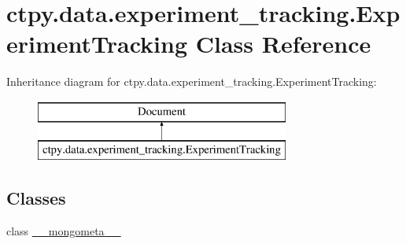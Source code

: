 \hypertarget{classctpy_1_1data_1_1experiment__tracking_1_1_experiment_tracking}{\section{ctpy.\-data.\-experiment\-\_\-tracking.\-Experiment\-Tracking Class Reference}
\label{classctpy_1_1data_1_1experiment__tracking_1_1_experiment_tracking}
}
Inheritance diagram for ctpy.\-data.\-experiment\-\_\-tracking.\-Experiment\-Tracking\-:\begin{figure}[H]
\begin{center}
\leavevmode
\includegraphics[height=2.000000cm]{classctpy_1_1data_1_1experiment__tracking_1_1_experiment_tracking}
\end{center}
\end{figure}
\subsection*{Classes}
\begin{DoxyCompactItemize}
\item 
class \hyperlink{classctpy_1_1data_1_1experiment__tracking_1_1_experiment_tracking_1_1____mongometa____}{\-\_\-\-\_\-mongometa\-\_\-\-\_\-}
\end{DoxyCompactItemize}

